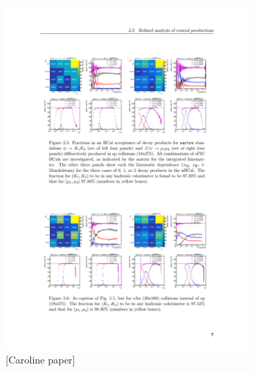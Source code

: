 \begin{figure}[H]
    \centering
    \begin{subfigure}{.48\linewidth}
        \includegraphics[width=.95\linewidth]{img/e+Au-phi(KK).pdf}
        \caption{[Caroline paper]}
        \label{fig:nhcal:e+Au-phi(KK)}
    \end{subfigure}
    \begin{subfigure}{.48\linewidth}

\end{subfigure}
\end{figure}
